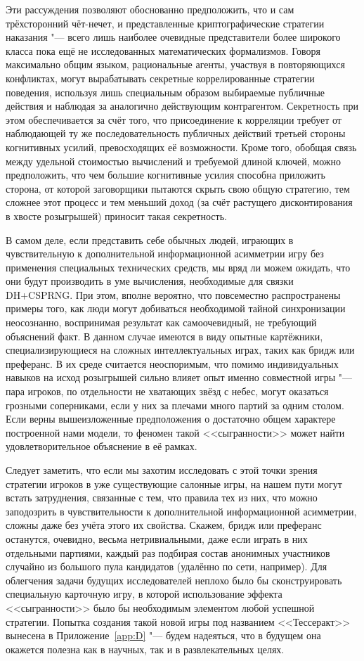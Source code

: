 Эти рассуждения позволяют обоснованно предположить, что и сам трёхсторонний чёт-нечет, и представленные криптографические стратегии наказания "--- всего лишь наиболее очевидные представители более широкого класса пока ещё не исследованных математических формализмов. Говоря максимально общим языком, рациональные агенты, участвуя в повторяющихся конфликтах, могут вырабатывать секретные коррелированные стратегии поведения, используя лишь специальным образом выбираемые публичные действия и наблюдая за аналогично действующим контрагентом. Секретность при этом обеспечивается за счёт того, что присоединение к корреляции требует от наблюдающей ту же последовательность публичных действий третьей стороны когнитивных усилий, превосходящих её возможности. Кроме того, обобщая связь между удельной стоимостью вычислений и требуемой длиной ключей, можно предположить, что чем большие когнитивные усилия способна приложить сторона, от которой заговорщики пытаются скрыть свою общую стратегию, тем сложнее этот процесс и тем меньший доход (за счёт растущего дисконтирования в хвосте розыгрышей) приносит такая секретность.

В самом деле, если представить себе обычных людей, играющих в чувствительную к дополнительной информационной асимметрии игру без применения специальных технических средств, мы вряд ли можем ожидать, что они будут производить в уме вычисления, необходимые для связки DH+CSPRNG. При этом, вполне вероятно, что повсеместно распространены примеры того, как люди могут добиваться необходимой тайной синхронизации неосознанно, воспринимая результат как самоочевидный, не требующий объяснений факт. В данном случае имеются в виду опытные картёжники, специализирующиеся на сложных интеллектуальных играх, таких как бридж или преферанс. В их среде считается неоспоримым, что помимо индивидуальных навыков на исход розыгрышей сильно влияет опыт именно совместной игры "--- пара игроков, по отдельности не хватающих звёзд с небес, могут оказаться грозными соперниками, если у них за плечами много партий за одним столом. Если верны вышеизложенные предположения о достаточно общем характере построенной нами модели, то феномен такой <<сыгранности>> может найти удовлетворительное объяснение в её рамках.

Следует заметить, что если мы захотим исследовать с этой точки зрения стратегии игроков в уже существующие салонные игры, на нашем пути могут встать затруднения, связанные с тем, что правила тех из них, что можно заподозрить в чувствительности к дополнительной информационной асимметрии, сложны даже без учёта этого их свойства. Скажем, бридж или преферанс останутся, очевидно, весьма нетривиальными, даже если играть в них отдельными партиями, каждый раз подбирая состав анонимных участников случайно из большого пула кандидатов (удалённо по сети, например). Для облегчения задачи будущих исследователей неплохо было бы сконструировать специальную карточную игру, в которой использование эффекта <<сыгранности>> было бы необходимым элементом любой успешной стратегии. Попытка создания такой новой игры под названием <<Тессеракт>> вынесена в Приложение~\cref{app:D} "--- будем надеяться, что в будущем она окажется полезна как в научных, так и в развлекательных целях.

